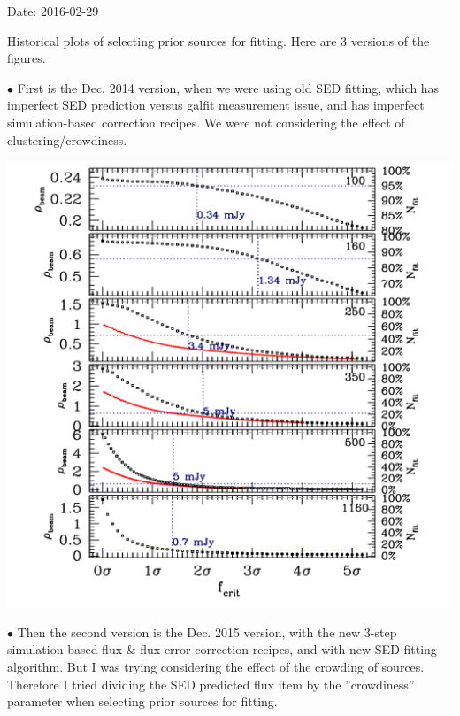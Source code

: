 \documentclass[11pt,a4paper]{article}
\begin{document}
\textcolor{green!90!black!60!orange}{Date: 2016-02-29}

Historical plots of selecting prior sources for fitting. Here are 3 versions of the figures. 

\indent\hspace{15pt}$\bullet$ 
First is the Dec. 2014 version, when we were using old SED fitting, which has imperfect SED prediction versus galfit measurement issue, and has imperfect simulation-based correction recipes. We were not considering the effect of clustering/crowdiness. 

\includegraphics[keepaspectratio=true,width=\textwidth]{galsed_plot_cutting_flux_201412}

\indent\hspace{15pt}$\bullet$ 
Then the second version is the Dec. 2015 version, with the new 3-step simulation-based flux \& flux error correction recipes, and with new SED fitting algorithm. But I was trying considering the effect of the crowding of sources. Therefore I tried dividing the SED predicted flux item by the ''crowdiness'' parameter when selecting prior sources for fitting. 
\end{document}
